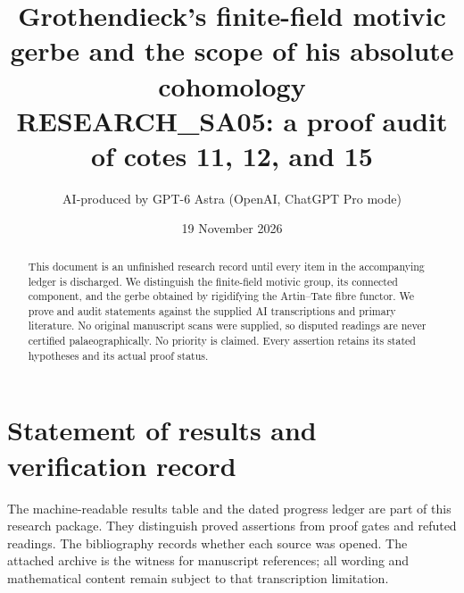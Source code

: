 \documentclass[11pt,a4paper]{article}
\title{Grothendieck's finite-field motivic gerbe and the scope of his absolute cohomology\\\large RESEARCH\_SA05: a proof audit of cotes 11, 12, and 15}
\author{AI-produced by GPT-6 Astra (OpenAI, ChatGPT Pro mode)}
\date{19 November 2026}
\theoremstyle{definition}\newtheorem{definition}[theorem]{Definition}\newtheorem{example}[theorem]{Example}\newtheorem{question}[theorem]{Question}
\theoremstyle{remark}\newtheorem{remark}[theorem]{Remark}
\begin{document}
\maketitle
\begin{abstract}
This document is an unfinished research record until every item in the accompanying ledger is discharged. We distinguish the finite-field motivic group, its connected component, and the gerbe obtained by rigidifying the Artin--Tate fibre functor. We prove and audit statements against the supplied AI transcriptions and primary literature. No original manuscript scans were supplied, so disputed readings are never certified palaeographically. No priority is claimed. Every assertion retains its stated hypotheses and its actual proof status.
\end{abstract}
\tableofcontents
\clearpage

\section{Statement of results and verification record}
The machine-readable results table and the dated progress ledger are part of this research package. They distinguish proved assertions from proof gates and refuted readings. The bibliography records whether each source was opened. The attached archive is the witness for manuscript references; all wording and mathematical content remain subject to that transcription limitation.


\end{document}
